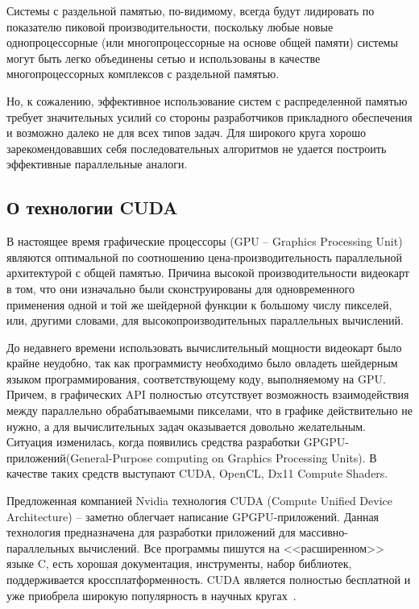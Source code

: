 \begin{enumerate}
Системы с раздельной памятью, по-видимому, всегда будут лидировать по показателю
пиковой производительности, поскольку любые новые однопроцессорные (или
многопроцессорные на основе общей памяти) системы могут быть легко объединены
сетью и использованы в качестве многопроцессорных комплексов с раздельной
памятью. 

Но, к сожалению, эффективное использование систем с распределенной памятью
требует значительных усилий со стороны разработчиков прикладного обеспечения и
возможно далеко не для всех типов задач. Для широкого круга хорошо
зарекомендовавших себя последовательных алгоритмов не удается построить
эффективные параллельные аналоги.
\end{enumerate}

\subsection{О технологии CUDA}
В настоящее время графические процессоры (GPU -- Graphics Processing Unit)
являются оптимальной по соотношению цена-производительность параллельной 
архитектурой с общей памятью. Причина высокой производительности видеокарт 
в том, что они изначально были сконструированы для одновременного применения
одной и той же шейдерной функции к большому числу пикселей, или, другими 
словами, для высокопроизводительных параллельных вычислений.

До недавнего времени использовать вычислительный мощности видеокарт было
крайне неудобно, так как программисту необходимо было
овладеть шейдерным языком программирования, соответствующему коду,
выполняемому на GPU. Причем, в графических API полностью отсутствует
возможность взаимодействия между параллельно обрабатываемыми пикселами,
что в графике действительно не нужно, а для вычислительных задач оказывается довольно
желательным. Ситуация изменилась, когда появились средства разработки
GPGPU-приложений(General-Purpose computing on Graphics Processing Units). 
В качестве таких средств выступают CUDA, OpenCL, Dx11 Compute
Shaders. 

Предложенная компанией Nvidia технология CUDA (Compute Unified Device Architecture) -- 
заметно облегчает написание GPGPU-приложений. Данная технология предназначена для
разработки приложений для массивно-параллельных вычислений. Все программы пишутся на
<<расширенном>> языке C, есть хорошая документация, инструменты, набор библиотек,
поддерживается кроссплатформенность. CUDA является полностью бесплатной и уже 
приобрела широкую популярность в научных кругах~\cite{Boreskov}.

